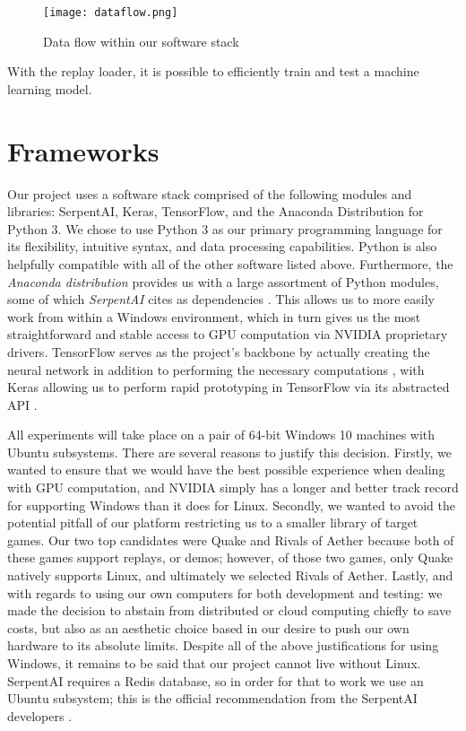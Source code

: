 \begin{figure}
	\caption{Data flow within our software stack}
	\centering
		\texttt{[image: dataflow.png]} \\
\end{figure}

With the replay loader, it is possible to efficiently train and test a machine learning model.


\section{Frameworks}

Our project uses a software stack comprised of the following modules and libraries: SerpentAI, Keras, TensorFlow, and the Anaconda Distribution for Python 3. We chose to use Python 3 as our primary programming language for its flexibility, intuitive syntax, and data processing capabilities. Python is also helpfully compatible with all of the other software listed above. Furthermore, the {\it Anaconda distribution} provides us with a large assortment of Python modules, some of which {\it SerpentAI} cites as dependencies \cite{SerpentAI}. This allows us to more easily work from within a Windows environment, which in turn gives us the most straightforward and stable access to GPU computation via NVIDIA proprietary drivers. TensorFlow serves as the project's backbone by actually creating the neural network in addition to performing the necessary computations \cite{TensorFlow}, with Keras allowing us to perform rapid prototyping in TensorFlow via its abstracted API \cite{Keras}.

All experiments will take place on a pair of 64-bit Windows 10 machines with Ubuntu subsystems. There are several reasons to justify this decision. Firstly, we wanted to ensure that we would have the best possible experience when dealing with GPU computation, and NVIDIA simply has a longer and better track record for supporting Windows than it does for Linux. Secondly, we wanted to avoid the potential pitfall of our platform restricting us to a smaller library of target games. Our two top candidates were Quake and Rivals of Aether because both of these games support replays, or demos; however, of those two games, only Quake natively supports Linux, and ultimately we selected Rivals of Aether. Lastly, and with regards to using our own computers for both development and testing: we made the decision to abstain from distributed or cloud computing chiefly to save costs, but also as an aesthetic choice based in our desire to push our own hardware to its absolute limits. Despite all of the above justifications for using Windows, it remains to be said that our project cannot live without Linux. SerpentAI requires a Redis database, so in order for that to work we use an Ubuntu subsystem; this is the official recommendation from the SerpentAI developers \cite{SerpentAI}.

